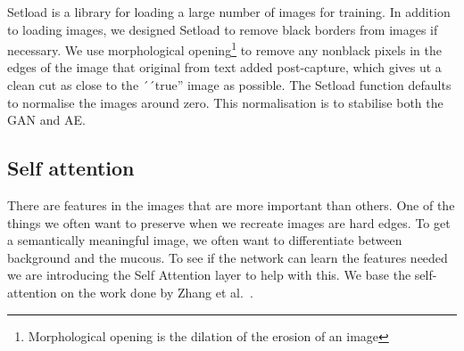 Setload is a library for loading a large number of images for training. In addition to loading images, we designed Setload to remove black borders from images if necessary. 
We use morphological opening\footnote{Morphological opening is the dilation of the erosion of an image } to remove any nonblack pixels in the edges of the image that original from text added post-capture, which gives ut a clean cut as close to the ´´true'' image as possible. The Setload function defaults to normalise the images around zero. This normalisation is to stabilise both the GAN and AE.


\subsection{Self attention}
\label{cha:attention}
There are features in the images that are more important than others. One of the things we often want to preserve when we recreate images are hard edges. To get a semantically meaningful image,  we often want to differentiate between background and the mucous. 
To see if the network can learn the features needed we are introducing the Self Attention layer to help with this. We base the self-attention on the work done by Zhang et al.~\cite{DBLP:journals/corr/selfattention}.


%


